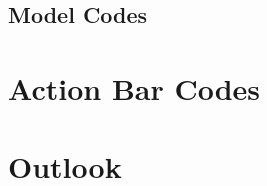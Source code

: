 \documentclass[11pt
  , a4paper
  , article
  , oneside
  , showtrims
]{memoir}
\begin{document}
\newpage
\section{Model Codes}
\vspace{1cm}



\newpage
\chapter{Action Bar Codes}
\vspace{1cm}



\chapter{Outlook}
\end{document}
